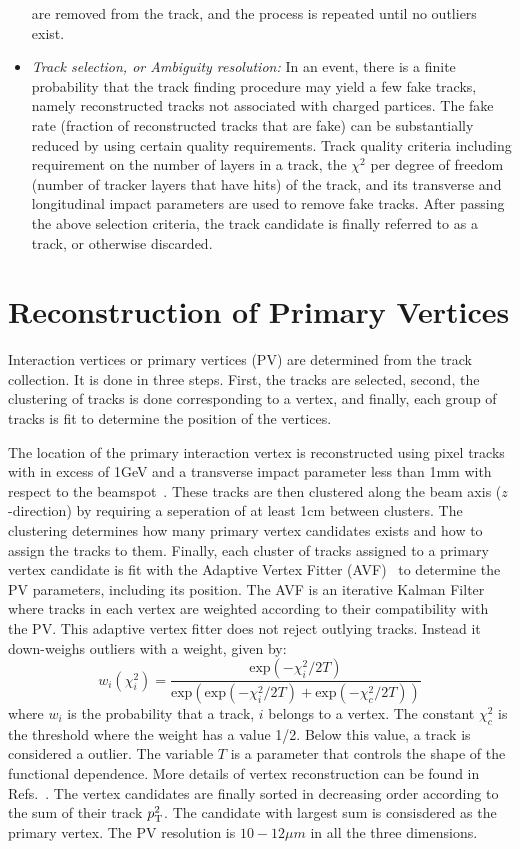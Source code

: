 \begin{itemize}
are removed from the track, and the process is repeated until no outliers exist.
\item \emph{Track selection, or Ambiguity resolution:} In an event, there is a finite probability that the track finding procedure may yield a 
few fake tracks, namely reconstructed tracks not associated with charged partices. The fake rate (fraction of reconstructed tracks that are fake) 
can be substantially reduced by using certain quality requirements. Track quality criteria including requirement on the number of layers in a track, 
the $\chi^{2}$ per degree of freedom (number of tracker layers that have hits)  of the track, and its transverse and longitudinal impact parameters 
are used to remove fake tracks. After passing the above selection criteria, the track candidate is finally referred to as a track, or otherwise discarded.
\end{itemize}

\section{Reconstruction of Primary Vertices}
Interaction vertices or primary vertices (PV) are determined from the track collection. It is done in three steps. First, the tracks are selected, 
second, the clustering of tracks is done corresponding to a vertex, and finally, each group of tracks is fit to determine the position of the vertices. 

The location of the primary interaction vertex is reconstructed using pixel tracks with \pt in excess of 1\unit{GeV} and a transverse impact parameter 
less than 1\unit{mm} with respect to the beamspot~\cite{Miao:1061285}. These tracks are then clustered along the beam axis ($z$-direction) by requiring
a seperation of at least 1\unit{cm} between clusters. The clustering determines how many primary vertex candidates exists and how to assign the 
tracks to them. Finally, each cluster of tracks assigned to a primary vertex candidate is fit with the Adaptive Vertex Fitter (AVF)~\cite
{Fruhwirth:1027031} to determine the PV parameters, including its position. The AVF is an iterative Kalman Filter where tracks in each vertex are 
weighted according to their compatibility with the PV. This adaptive vertex fitter does not reject outlying tracks. Instead it down-weighs outliers
with a weight, given by:
\begin{equation}
w_{i}(\chi_{i}^{2})=  \frac{\text{exp}(-\chi^{2}_{i}/2T)} {\text{exp}(\text{exp}(-\chi^{2}_{i}/2T) + \text{exp}(-\chi^{2}_{c}/2T)) }
\end{equation}
where $w_{i}$ is the probability that a track, $i$ belongs to a vertex. The constant $\chi_{c}^{2}$ is the threshold where the weight has a value
1/2. Below this value, a track is considered a outlier. The variable $T$ is a parameter that controls the shape of the functional dependence. More
details of vertex reconstruction can be found in Refs.~\cite{Schmidt:1345323, Fruhwirth:1027031, Chatrchyan:2014fea}. The vertex candidates are finally
sorted in decreasing order according to the sum of their track $p_{\mathrm T}^{2}$. The candidate with largest sum is consisdered as the primary vertex.
The PV resolution is $10-12\unit{\mu{m}}$ in all the three dimensions. 

